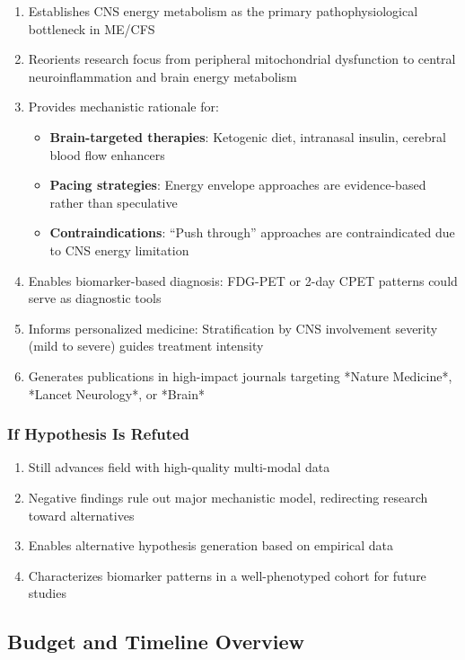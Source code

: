 \begin{enumerate}
    \item Establishes CNS energy metabolism as the primary pathophysiological bottleneck in ME/CFS
    \item Reorients research focus from peripheral mitochondrial dysfunction to central neuroinflammation and brain energy metabolism
    \item Provides mechanistic rationale for:
    \begin{itemize}
        \item \textbf{Brain-targeted therapies}: Ketogenic diet, intranasal insulin, cerebral blood flow enhancers
        \item \textbf{Pacing strategies}: Energy envelope approaches are evidence-based rather than speculative
        \item \textbf{Contraindications}: ``Push through'' approaches are contraindicated due to CNS energy limitation
    \end{itemize}
    \item Enables biomarker-based diagnosis: FDG-PET or 2-day CPET patterns could serve as diagnostic tools
    \item Informs personalized medicine: Stratification by CNS involvement severity (mild to severe) guides treatment intensity
    \item Generates publications in high-impact journals targeting *Nature Medicine*, *Lancet Neurology*, or *Brain*
\end{enumerate}

\subsubsection{If Hypothesis Is Refuted}

\begin{enumerate}
    \item Still advances field with high-quality multi-modal data
    \item Negative findings rule out major mechanistic model, redirecting research toward alternatives
    \item Enables alternative hypothesis generation based on empirical data
    \item Characterizes biomarker patterns in a well-phenotyped cohort for future studies
\end{enumerate}

\subsection{Budget and Timeline Overview}

